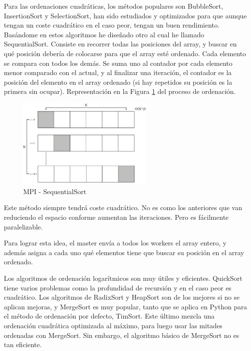 	Para las ordenaciones cuadráticas, los métodos populares son BubbleSort, InsertionSort y SelectionSort, han sido estudiados y optimizados para que aunque tengan un coste cuadrático en el caso peor, tengan un buen rendimiento. Basándome en estos algoritmos he diseñado otro al cual he llamado SequentialSort. Consiste en recorrer todas las posiciones del array, y buscar en qué posición debería de colocarse para que el array esté ordenado. Cada elemento se compara con todos los demás. Se suma uno al contador por cada elemento menor comparado con el actual, y al finalizar una iteración, el contador es la posición del elemento en el array ordenado (si hay repetidos su posición es la primera sin ocupar). Representación en la Figura \ref{fig:sequentialsortmpi} del proceso de ordenación.







	\begin{figure}[!h]
		\centering
		\includegraphics[width=0.6\textwidth]{images/chapter_3/sequentialsort_mpi}
		\caption{MPI - SequentialSort}
		\label{fig:sequentialsortmpi}
	\end{figure}
	
	Este método siempre tendrá coste cuadrático. No es como los anteriores que van reduciendo el espacio conforme aumentan las iteraciones. Pero es fácilmente paralelizable. 
	
	Para lograr esta idea, el master envía a todos los workers el array entero, y además asigna a cada uno qué elementos tiene que buscar su posición en el array ordenado.



	Los algoritmos de ordenación logarítmicos son muy útiles y eficientes. QuickSort tiene varios problemas como la profundidad de recursión y en el caso peor es cuadrático. Los algoritmos de RadixSort y HeapSort son de los mejores si no se aplican mejoras,  y MergeSort es muy popular, tanto que se aplica en Python para el método de ordenación por defecto, TimSort\cite{auger2015merge}. Este último mezcla una ordenación cuadrática optimizada al máximo, para luego usar las mitades ordenadas con MergeSort. Sin embargo, el algoritmo básico de MergeSort no es tan eficiente.
	
